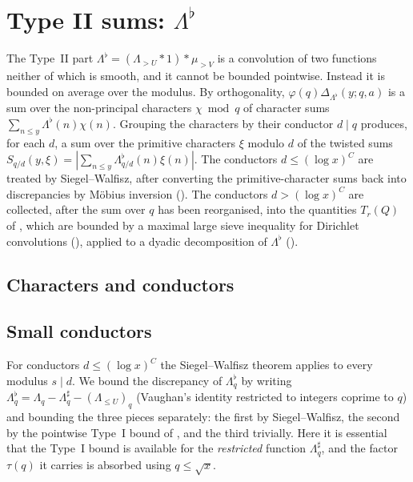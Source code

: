 \chapter{Type II sums: \texorpdfstring{$\Lambda^\flat$}{Lambda flat}}\label{ch:typeII}

The Type~II part $\Lambda^\flat = (\Lambda_{>U} * 1) * \mu_{>V}$ is a convolution of two functions neither of
which is smooth, and it cannot be bounded pointwise. Instead it is bounded on average over the
modulus. By orthogonality, $\varphi(q)\Delta_{\Lambda^\flat}(y; q, a)$ is a sum over the non-principal
characters $\chi \bmod q$ of character sums $\sum_{n \le y} \Lambda^\flat(n)\chi(n)$. Grouping the characters
by their conductor $d \mid q$ produces, for each $d$, a sum over the primitive characters $\xi$ modulo
$d$ of the twisted sums $S_{q/d}(y, \xi) = |\sum_{n \le y} \Lambda^\flat_{q/d}(n)\xi(n)|$. The conductors
$d \le (\log x)^C$ are treated by Siegel--Walfisz, after converting the primitive-character sums
back into discrepancies by Möbius inversion (). The conductors $d > (\log x)^C$
are collected, after the sum over $q$ has been reorganised, into the quantities $T_r(Q)$ of
, which are bounded by a maximal large sieve inequality for Dirichlet
convolutions (), applied to a dyadic decomposition of $\Lambda^\flat$
().

\section{Characters and conductors}\label{sec:conductors}





\section{Small conductors}\label{sec:small-cond}

For conductors $d \le (\log x)^C$ the Siegel--Walfisz theorem applies to every modulus $s \mid d$. We
bound the discrepancy of $\Lambda^\flat_q$ by writing $\Lambda^\flat_q = \Lambda_q - \Lambda^\sharp_q - (\Lambda_{\le U})_q$
(Vaughan's identity restricted to integers coprime to $q$) and bounding the three pieces separately:
the first by Siegel--Walfisz, the second by the pointwise Type~I bound of ,
and the third trivially. Here it is essential that the Type~I bound is available for the
\emph{restricted} function $\Lambda^\sharp_q$, and the factor $\tau(q)$ it carries is absorbed using
$q \le \sqrt x$.

